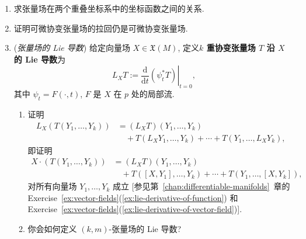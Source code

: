\begin{RiemannExercise}\label{ex:tensor-fields}
\begin{enumerate}[label=(\arabic*),ref=\arabic*,leftmargin=*]
\item\label{ex:components-of-tensor-under-coordinate-change} 求张量场在两个重叠坐标系中的坐标函数之间的关系.
\item\label{ex:smooth-pullback-of-covariant-tensor} 证明可微协变张量场的拉回仍是可微协变张量场.
\item\label{ex:lie-derivative-of-tensors} (\emph{张量场的 Lie 导数}) 给定向量场 $X\in\mathfrak{X}(M)$, 定义\textbf{$k$ 重协变张量场 $T$ 沿 $X$ 的 Lie 导数}为
\[
  L_XT:=\left.\frac{\mathrm{d}}{\mathrm{d}t}(\psi_t^*T)\right|_{t=0},
\]
其中 $\psi_t=F(\cdot,t)$, $F$ 是 $X$ 在 $p$ 处的局部流.
\begin{enumerate}[label=(\alph*),leftmargin=*]
\item 证明
\begin{align*}
  L_X(T(Y_1,\ldots,Y_k))
  &=(L_XT)(Y_1,\ldots,Y_k)\\
  &\quad+T(L_XY_1,\ldots,Y_k)+\cdots+T(Y_1,\ldots,L_XY_k),
\end{align*}
即证明
\begin{align*}
  X\cdot(T(Y_1,\ldots,Y_k))
  &=(L_XT)(Y_1,\ldots,Y_k)\\
  &\quad+T([X,Y_1],\ldots,Y_k)+\cdots+T(Y_1,\ldots,[X,Y_k]),
\end{align*}
对所有向量场 $Y_1,\ldots,Y_k$ 成立 [参见第~\ref{chap:differentiable-manifolds}~章的 Exercise~\ref{ex:vector-fields}(\ref{ex:lie-derivative-of-function}) 和 Exercise~\ref{ex:vector-fields}(\ref{ex:lie-derivative-of-vector-field})].
\item 你会如何定义 $(k,m)$-张量场的 Lie 导数?
\end{enumerate}
\end{enumerate}
\end{RiemannExercise}
